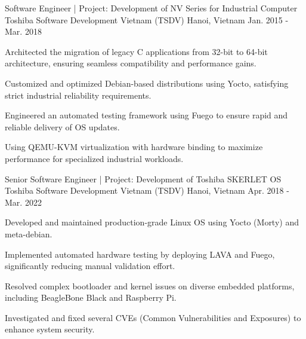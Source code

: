 

\begin{cventries}

  \cventry
    {Software Engineer | Project: Development of NV Series for Industrial Computer} %
    {Toshiba Software Development Vietnam (TSDV)} %
    {Hanoi, Vietnam} %
    {Jan. 2015 - Mar. 2018} %
    {
      \begin{cvitems} %
        \item {Architected the migration of legacy C applications from 32-bit to 64-bit architecture, ensuring seamless compatibility and performance gains.}
        \item {Customized and optimized Debian-based distributions using Yocto, satisfying strict industrial reliability requirements.}
        \item {Engineered an automated testing framework using Fuego to ensure rapid and reliable delivery of OS updates.}
        \item {Using QEMU-KVM virtualization with hardware binding to maximize performance for specialized industrial workloads.}
      \end{cvitems}
    }

  \cventry
    {Senior Software Engineer | Project: Development of Toshiba SKERLET OS} %
    {Toshiba Software Development Vietnam (TSDV)} %
    {Hanoi, Vietnam} %
    {Apr. 2018 - Mar. 2022} %
    {
      \begin{cvitems} %
        \item {Developed and maintained production-grade Linux OS using Yocto (Morty) and meta-debian.}
        \item {Implemented automated hardware testing by deploying LAVA and Fuego, significantly reducing manual validation effort.}
        \item {Resolved complex bootloader and kernel issues on diverse embedded platforms, including BeagleBone Black and Raspberry Pi.}
        \item {Investigated and fixed several CVEs (Common Vulnerabilities and Exposures) to enhance system security.}
      \end{cvitems}
    }


\end{cventries}
